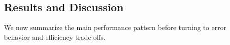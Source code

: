 \documentclass[conference, onecolumn]{IEEEtran}
\begin{document}
\subsection{Results and Discussion}
\label{subsec:results_discussion}



We now summarize the main performance pattern before turning to error behavior and efficiency trade-offs.
\end{document}
